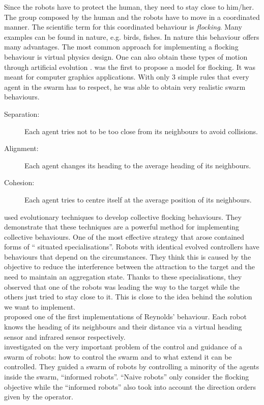 \documentclass[oneside, a4paper, 12pt]{memoir}
\begin{document}
		Since the robots have to protect the human, they need to stay close to him/her. The group composed by the human and the robots have to move in a coordinated manner. The scientific term for this coordinated behaviour is \emph{flocking}. Many examples can be found in nature, e.g. birds, fishes. In nature this behaviour offers many advantages. The most common approach for implementing a flocking behaviour is virtual physics design. One can also obtain these types of motion through artificial evolution \citep{brambilla2013swarm}. \citet{reynolds1987flocks} was the first to propose a model for flocking. It was meant for computer graphics applications. With only 3 simple rules that every agent in the swarm has to respect, he was able to obtain very realistic swarm behaviours.
		\begin{description}
			\item[Separation:] Each agent tries not to be too close from its neighbours to avoid collisions.
			\item[Alignment:] Each agent changes its heading to the average heading of its neighbours.
			\item[Cohesion:] Each agent tries to centre itself at the average position of its neighbours.
		\end{description}
		\citet{baldassarre2003evolving} used evolutionary techniques to develop collective flocking behaviours. They demonstrate that these techniques are a powerful method for implementing collective behaviours. One of the most effective strategy that arose contained forms of \enquote{ situated specialisations}. Robots with identical evolved controllers have behaviours that depend on the circumstances. They think this is caused by the objective to reduce the interference between the attraction to the target and the need to maintain an aggregation state. Thanks to these specialisations, they observed that one of the robots was leading the way to the target while the others just tried to stay close to it. This is close to the idea behind the solution we want to implement.\\
		\citet{turgut2008self} proposed one of the first implementations of Reynolds' \citep{reynolds1987flocks} behaviour. Each robot knows the heading of its neighbours and their distance via a virtual heading sensor and infrared sensor respectively.\\
		\citet{ccelikkanat2010steering} investigated on the very important problem of the control and guidance of a swarm of robots: how to control the swarm and to what extend it can be controlled. They guided a swarm of robots by controlling a minority of the agents inside the swarm, \enquote{informed robots}. \enquote{Naive robots} only consider the flocking objective while the \enquote{informed robots} also took into account the direction orders given by the operator.
		
\end{document}
